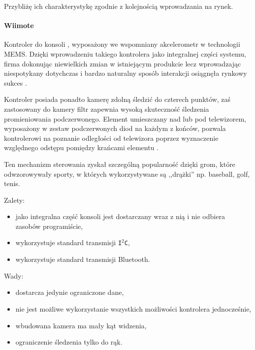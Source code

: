 Przybliżę ich charakterystykę zgodnie z kolejnością wprowadzania na rynek.

\paragraph{Wiimote}
Kontroler do konsoli , wyposażony we wspomniany akcelerometr w technologii MEMS. Dzięki wprowadzeniu takiego kontrolera jako integralnej części systemu, firma  dokonując  niewielkich zmian w istniejącym produkcie \ppauza {} \ppauza lecz wprowadzając niespotykany dotychczas i bardzo naturalny sposób interakcji osiągnęła rynkowy sukces \citep{WiiSales}.

Kontroler posiada ponadto kamerę zdolną śledzić do czterech punktów, zaś zastosowany do kamery filtr zapewnia wysoką skuteczność śledzenia promieniowania podczerwonego. Element  umieszczany nad lub pod telewizorem, wyposażony w zestaw podczerwonych diod na każdym z końców, pozwala kontrolerowi na poznanie odległości od telewizora poprzez wyznaczenie względnego odstępu pomiędzy krańcami elementu .

Ten mechanizm sterowania zyskał szczególną popularność dzięki grom, które odwzorowywały sporty, w których wykorzystywane są ,,drążki'' \ppauza np. baseball, golf, tenis.

Zalety:
\begin{itemize}
  \item jako integralna część konsoli jest dostarczany wraz z nią i nie odbiera zasobów programiście,
  \item wykorzystuje standard transmisji \texttt{I$^2$C},
  \item wykorzystuje standard transmisji Bluetooth.
\end{itemize}

Wady:
\begin{itemize}
  \item dostarcza jedynie ograniczone dane,
  \item nie jest możliwe wykorzystanie wszystkich możliwości kontrolera jednocześnie,
  \item wbudowana kamera ma mały kąt widzenia,
  \item ograniczenie śledzenia tylko do rąk.
\end{itemize}


